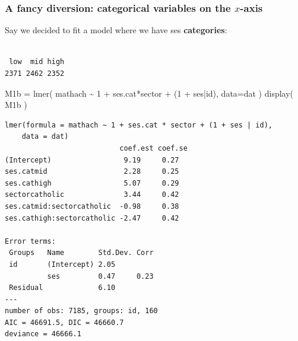 \documentclass[
  letterpaper,
  DIV=11,
  numbers=noendperiod]{scrreprt}
\newenvironment{Shaded}{\begin{snugshade}}{\end{snugshade}}
\newcommand{\AttributeTok}[1]{\textcolor[rgb]{0.49,0.56,0.16}{#1}}
\newcommand{\ConstantTok}[1]{\textcolor[rgb]{0.53,0.00,0.00}{#1}}
\newcommand{\DecValTok}[1]{\textcolor[rgb]{0.25,0.63,0.44}{#1}}
\newcommand{\FloatTok}[1]{\textcolor[rgb]{0.25,0.63,0.44}{#1}}
\newcommand{\FunctionTok}[1]{\textcolor[rgb]{0.02,0.16,0.49}{#1}}
\newcommand{\NormalTok}[1]{\textcolor[rgb]{0.00,0.44,0.13}{#1}}
\newcommand{\OtherTok}[1]{\textcolor[rgb]{0.00,0.44,0.13}{#1}}
\newcommand{\SpecialCharTok}[1]{\textcolor[rgb]{0.25,0.44,0.63}{#1}}
\newcommand{\StringTok}[1]{\textcolor[rgb]{0.25,0.44,0.63}{#1}}
\begin{document}
\hypertarget{a-fancy-diversion-categorical-variables-on-the-x-axis}{%
\subsubsection{\texorpdfstring{A fancy diversion: categorical variables
on the
\(x\)-axis}{A fancy diversion: categorical variables on the x-axis}}\label{a-fancy-diversion-categorical-variables-on-the-x-axis}}

Say we decided to fit a model where we have ses \textbf{categories}:

\begin{Shaded}
\end{Shaded}

\begin{verbatim}

 low  mid high 
2371 2462 2352 
\end{verbatim}

\begin{Shaded}
\begin{Highlighting}[]
\NormalTok{M1b }\OtherTok{=} \FunctionTok{lmer}\NormalTok{( mathach }\SpecialCharTok{\textasciitilde{}} \DecValTok{1} \SpecialCharTok{+}\NormalTok{ ses.cat}\SpecialCharTok{*}\NormalTok{sector }\SpecialCharTok{+}\NormalTok{ (}\DecValTok{1} \SpecialCharTok{+}\NormalTok{ ses}\SpecialCharTok{|}\NormalTok{id), }\AttributeTok{data=}\NormalTok{dat )}
\FunctionTok{display}\NormalTok{( M1b )}
\end{Highlighting}
\end{Shaded}

\begin{verbatim}
lmer(formula = mathach ~ 1 + ses.cat * sector + (1 + ses | id), 
    data = dat)
                           coef.est coef.se
(Intercept)                 9.19     0.27  
ses.catmid                  2.28     0.25  
ses.cathigh                 5.07     0.29  
sectorcatholic              3.44     0.42  
ses.catmid:sectorcatholic  -0.98     0.38  
ses.cathigh:sectorcatholic -2.47     0.42  

Error terms:
 Groups   Name        Std.Dev. Corr 
 id       (Intercept) 2.05          
          ses         0.47     0.23 
 Residual             6.10          
---
number of obs: 7185, groups: id, 160
AIC = 46691.5, DIC = 46660.7
deviance = 46666.1 
\end{verbatim}
\end{document}
